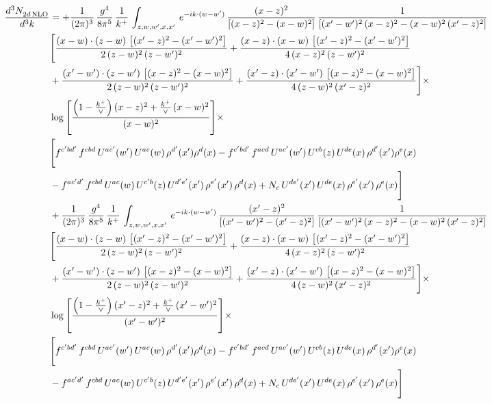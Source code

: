 \documentclass[9pt]{article}
\numberwithin{equation}{section}
\begin{document}
\begin{align}
 \frac{d^{3}N_{2d\,\rm NLO}^{\rm}}{d^{3}k}  & =   +\frac{1}{(2\pi)^{3}}\, \frac{g^{4}}{8\pi^{5}}\,\frac{1}{k^{+}}\,\int_{z,w,w^{\prime},x,x'}\, e^{-ik\cdot (w-w')}\,\frac{(x-z)^{2}}{\left[(x-z)^{2}-(x-w)^{2}\right]}\,\frac{1}{\left[(x'-w')^{2}\,(x-z)^{2} - (x-w)^{2}\,(x'-z)^{2}\right]}\notag \\ & \Bigg[\frac{(x-w)\cdot (z-w)\, \left[(x'-z)^{2}-(x'-w')^{2}\right]}{2\, (z-w)^{2}\, (z-w')^{2}}  + \frac{(x-z)\cdot (x-w)\,\left[(x'-z)^{2}-(x'-w')^{2}\right] }{4\,(x-z)^{2}\,(z-w')^{2}}\notag \\ & +\frac{(x'-w')\cdot (z-w')\, \left[(x-z)^{2}-(x-w)^{2}\right]}{2\, (z-w)^{2}\, (z-w')^{2}}+ \frac{(x'-z)\cdot (x'-w')\, \left[(x-z)^{2}-(x-w)^{2}\right]}{4\, (z-w)^{2}\,(x'-z)^{2}}\Bigg]\times\,\notag \\ & \log{\left[\frac{\left(1-\frac{k^{+}}{\vee}\right)(x-z)^{2}+\frac{k^{+}}{\vee}\,(x-w)^{2}}{(x-w)^{2}}\right]} \times\notag \\ & \Bigg[f^{c'bd'}\,f^{cbd}\, U^{ac'}(w')\,U^{ac}(w)\,\rho^{d'}(x')\rho^{d}(x)- f^{c'bd'}\,f^{acd}\,U^{ac'}(w')\,U^{cb}(z)\,U^{de}(x)\,\rho^{d'}(x')\rho^{e}(x) \notag \\ & -f^{ac'd'}\,f^{cbd}\,U^{ac}(w)\,U^{c'b}(z)\,U^{d'e'}(x')\,\rho^{e'}(x')\,\rho^{d}(x) +N_{c}\,U^{de'}(x')\,U^{de}(x)\,\rho^{e'}(x')\,\rho^{e}(x)\Bigg] \notag \\
& +\frac{1}{(2\pi)^{3}}\, \frac{g^{4}}{8\pi^{5}}\,\frac{1}{k^{+}}\,\int_{z,w,w^{\prime},x,x'}\, e^{-ik\cdot (w-w')}\,\frac{(x'-z)^{2}}{\left[(x'-w')^{2}-(x'-z)^{2}\right]}\,\frac{1}{\left[(x'-w')^{2}\,(x-z)^{2} - (x-w)^{2}\,(x'-z)^{2}\right]}\notag \\ & \Bigg[\frac{(x-w)\cdot (z-w)\, \left[(x'-z)^{2}-(x'-w')^{2}\right]}{2\, (z-w)^{2}\, (z-w')^{2}}  + \frac{(x-z)\cdot (x-w)\,\left[(x'-z)^{2}-(x'-w')^{2}\right] }{4\,(x-z)^{2}\,(z-w')^{2}}\notag \\ & +\frac{(x'-w')\cdot (z-w')\, \left[(x-z)^{2}-(x-w)^{2}\right]}{2\, (z-w)^{2}\, (z-w')^{2}}+ \frac{(x'-z)\cdot (x'-w')\, \left[(x-z)^{2}-(x-w)^{2}\right]}{4\, (z-w)^{2}\,(x'-z)^{2}}\Bigg]\times\,\notag \\ & \log{\left[\frac{\left(1-\frac{k^{+}}{\vee}\right)(x'-z)^{2}+\frac{k^{+}}{\vee}\,(x'-w')^{2}}{(x'-w')^{2}}\right]} \times\notag \\ & \Bigg[f^{c'bd'}\,f^{cbd}\, U^{ac'}(w')\,U^{ac}(w)\,\rho^{d'}(x')\rho^{d}(x)- f^{c'bd'}\,f^{acd}\,U^{ac'}(w')\,U^{cb}(z)\,U^{de}(x)\,\rho^{d'}(x')\rho^{e}(x) \notag \\ & -f^{ac'd'}\,f^{cbd}\,U^{ac}(w)\,U^{c'b}(z)\,U^{d'e'}(x')\,\rho^{e'}(x')\,\rho^{d}(x) +N_{c}\,U^{de'}(x')\,U^{de}(x)\,\rho^{e'}(x')\,\rho^{e}(x)\Bigg]
\end{align}
\end{document}
